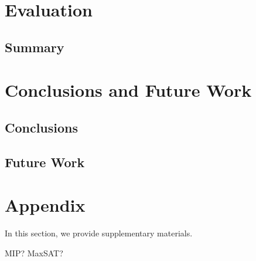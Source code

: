 \documentclass{article}
\theoremstyle{definition}
\begin{document}
\section{Evaluation}
\label{sec:osd:evaluation}

\subsection{Summary}
\label{sec:osd:evaluation:summary}

\section{Conclusions and Future Work}
\label{sec:osd:conclusion}

\subsection{Conclusions}
\label{sec:osd:conclusion:conclusion}

\subsection{Future Work}
\label{sec:osd:conclusion:future-work}


\appendix

\section{Appendix}
\label{sec:osd:appendix}

In this section, we provide supplementary materials.

MIP?
MaxSAT?

\renewcommand*{\bibfont}{\small} %
\printbibliography
\end{document}
